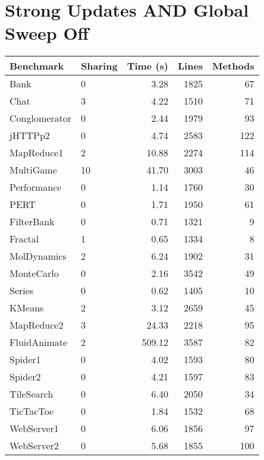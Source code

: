 \documentclass{article}
\begin{document}
\section{Strong Updates AND Global Sweep Off}
\begin{tabular}{|l|l|r|r|r|}
\hline
Benchmark & Sharing & Time (s) & Lines & Methods \\
\hline
Bank & 0 & 3.28 & 1825 & 67 \\
Chat & 3 & 4.22 & 1510 & 71 \\
Conglomerator & 0 & 2.44 & 1979 & 93 \\
jHTTPp2 & 0 & 4.74 & 2583 & 122 \\
MapReduce1 & 2 & 10.88 & 2274 & 114 \\
MultiGame & 10 & 41.70 & 3003 & 46 \\
Performance & 0 & 1.14 & 1760 & 30 \\
PERT & 0 & 1.71 & 1950 & 61 \\
FilterBank & 0 & 0.71 & 1321 & 9 \\
Fractal & 1 & 0.65 & 1334 & 8 \\
MolDynamics & 2 & 6.24 & 1902 & 31 \\
MonteCarlo & 0 & 2.16 & 3542 & 49 \\
Series & 0 & 0.62 & 1405 & 10 \\
KMeans & 2 & 3.12 & 2659 & 45 \\
MapReduce2 & 3 & 24.33 & 2218 & 95 \\
FluidAnimate & 2 & 509.12 & 3587 & 82 \\
Spider1 & 0 & 4.02 & 1593 & 80 \\
Spider2 & 0 & 4.21 & 1597 & 83 \\
TileSearch & 0 & 6.40 & 2050 & 34 \\
TicTacToe & 0 & 1.84 & 1532 & 68 \\
WebServer1 & 0 & 6.06 & 1856 & 97 \\
WebServer2 & 0 & 5.68 & 1855 & 100 \\
\hline
\end{tabular}
\end{document}
